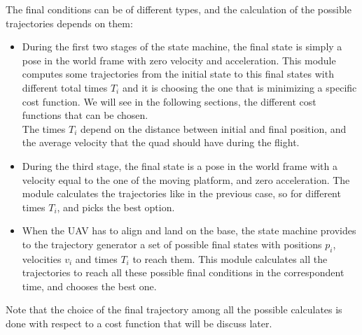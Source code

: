 The final conditions can be of different types, and the calculation of the possible trajectories depends on them:
\begin{itemize}
\item During the first two stages of the state machine, the final state is simply a pose in the world frame with zero velocity and acceleration. This module computes some trajectories from the initial state to this final states with different total times $T_i$ and it is choosing the one that is minimizing a specific cost function. We will see in the following sections, the different cost functions that can be chosen.\\ 
The times $T_i$ depend on the distance between initial and final position, and the average velocity that the quad should have during the flight.
\item During the third stage, the final state is a pose in the world frame with a velocity equal to the one of the moving platform, and zero acceleration. The module calculates the trajectories like in the previous case, so for different times $T_i$, and picks the best option.
\item When the UAV has to align and land on the base, the state machine provides to the trajectory generator a set of possible final states with positions $p_i$, velocities $v_i$ and times $T_i$ to reach them. This module calculates all the trajectories to reach all these possible final conditions in the correspondent time, and chooses the best one.
\end{itemize}
Note that the choice of the final trajectory among all the possible calculates is done with respect to a cost function that will be discuss later.

